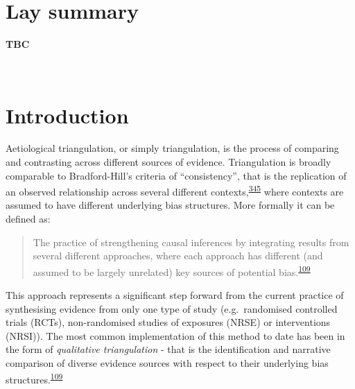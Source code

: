 \documentclass[a4paper, twoside]{templates/ociamthesis}
\begin{document}
\minitoc 

\hypertarget{lay-summary-6}{%
\section{Lay summary}\label{lay-summary-6}}

\textbf{TBC}

~

\newpage

\newpage

\hypertarget{triangulation-overview}{%
\section{Introduction}\label{triangulation-overview}}

Aetiological triangulation, or simply triangulation, is the process of comparing and contrasting across different sources of evidence. Triangulation is broadly comparable to Bradford-Hill's criteria of ``consistency'', that is the replication of an observed relationship across several different contexts,\textsuperscript{\protect\hyperlink{ref-hill1965}{345}} where contexts are assumed to have different underlying bias structures. More formally it can be defined as:

\begin{quote}
The practice of strengthening causal inferences by integrating results from several different approaches, where each approach has different (and assumed to be largely unrelated) key sources of potential bias.\textsuperscript{\protect\hyperlink{ref-lawlor2016}{109}}
\end{quote}

This approach represents a significant step forward from the current practice of synthesising evidence from only one type of study (e.g.~randomised controlled trials (RCTs), non-randomised studies of exposures (NRSE) or interventions (NRSI)). The most common implementation of this method to date has been in the form of \emph{qualitative triangulation} - that is the identification and narrative comparison of diverse evidence sources with respect to their underlying bias structures.\textsuperscript{\protect\hyperlink{ref-lawlor2016}{109}}
\end{document}
